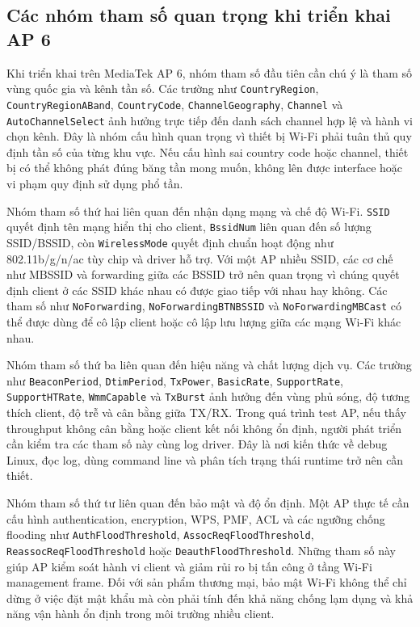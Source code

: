 \documentclass[11pt]{article}
\newcommand{\code}[1]{\texttt{#1}}
\begin{document}
\subsection{Các nhóm tham số quan trọng khi triển khai AP 6}

Khi triển khai trên MediaTek AP 6, nhóm tham số đầu tiên cần chú ý là tham số vùng quốc gia và kênh tần số. Các trường như \code{CountryRegion}, \code{CountryRegionABand}, \code{CountryCode}, \code{ChannelGeography}, \code{Channel} và \code{AutoChannelSelect} ảnh hưởng trực tiếp đến danh sách channel hợp lệ và hành vi chọn kênh. Đây là nhóm cấu hình quan trọng vì thiết bị Wi-Fi phải tuân thủ quy định tần số của từng khu vực. Nếu cấu hình sai country code hoặc channel, thiết bị có thể không phát đúng băng tần mong muốn, không lên được interface hoặc vi phạm quy định sử dụng phổ tần.

Nhóm tham số thứ hai liên quan đến nhận dạng mạng và chế độ Wi-Fi. \code{SSID} quyết định tên mạng hiển thị cho client, \code{BssidNum} liên quan đến số lượng SSID/BSSID, còn \code{WirelessMode} quyết định chuẩn hoạt động như 802.11b/g/n/ac tùy chip và driver hỗ trợ. Với một AP nhiều SSID, các cơ chế như MBSSID và forwarding giữa các BSSID trở nên quan trọng vì chúng quyết định client ở các SSID khác nhau có được giao tiếp với nhau hay không. Các tham số như \code{NoForwarding}, \code{NoForwardingBTNBSSID} và \code{NoForwardingMBCast} có thể được dùng để cô lập client hoặc cô lập lưu lượng giữa các mạng Wi-Fi khác nhau.

Nhóm tham số thứ ba liên quan đến hiệu năng và chất lượng dịch vụ. Các trường như \code{BeaconPeriod}, \code{DtimPeriod}, \code{TxPower}, \code{BasicRate}, \code{SupportRate}, \code{SupportHTRate}, \code{WmmCapable} và \code{TxBurst} ảnh hưởng đến vùng phủ sóng, độ tương thích client, độ trễ và cân bằng giữa TX/RX. Trong quá trình test AP, nếu thấy throughput không cân bằng hoặc client kết nối không ổn định, người phát triển cần kiểm tra các tham số này cùng log driver. Đây là nơi kiến thức về debug Linux, đọc log, dùng command line và phân tích trạng thái runtime trở nên cần thiết.

Nhóm tham số thứ tư liên quan đến bảo mật và độ ổn định. Một AP thực tế cần cấu hình authentication, encryption, WPS, PMF, ACL và các ngưỡng chống flooding như \code{AuthFloodThreshold}, \code{AssocReqFloodThreshold}, \code{ReassocReqFloodThreshold} hoặc \code{DeauthFloodThreshold}. Những tham số này giúp AP kiểm soát hành vi client và giảm rủi ro bị tấn công ở tầng Wi-Fi management frame. Đối với sản phẩm thương mại, bảo mật Wi-Fi không thể chỉ dừng ở việc đặt mật khẩu mà còn phải tính đến khả năng chống lạm dụng và khả năng vận hành ổn định trong môi trường nhiều client.
\end{document}
